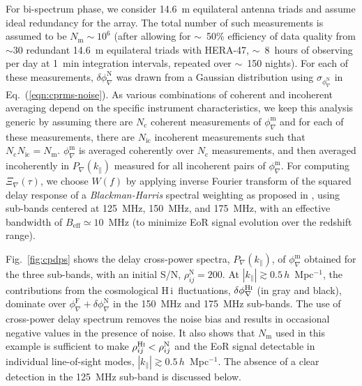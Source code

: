 \documentclass[
reprint,
superscriptaddress,
amsmath,
amssymb,
aps,
prd
]{revtex4-1}
\newcommand{\HI}{H\,{\sc i}}
\begin{document}
For bi-spectrum phase, we consider 14.6~m equilateral antenna triads and assume ideal redundancy for the array. The total number of such measurements is assumed to be $N_\textrm{m} \sim 10^6$ (after allowing for $\sim$~50\% efficiency of data quality from $\sim 30$ redundant 14.6~m equilateral triads with HERA-47, $\sim$~8~hours of observing per day at 1~min integration intervals, repeated over $\sim$~150 nights). For each of these measurements, $\delta\phi_\nabla^\textrm{N}$ was drawn from a Gaussian distribution using $\sigma_{\phi_\nabla^\textrm{N}}$ in Eq.~(\ref{eqn:cprms-noise}). As various combinations of coherent and incoherent averaging depend on the specific instrument characteristics, we keep this analysis generic by assuming there are $N_\textrm{c}$ coherent measurements of $\phi_\nabla^\textrm{m}$ and for each of these measurements, there are $N_\textrm{ic}$ incoherent measurements such that $N_\textrm{c}N_\textrm{ic}=N_\textrm{m}$. $\phi_\nabla^\textrm{m}$ is averaged coherently over $N_\textrm{c}$ measurements, and then averaged incoherently in $P_\nabla(k_\parallel)$ measured for all incoherent pairs of $\phi_\nabla^\textrm{m}$. For computing $\Xi_\nabla(\tau)$, we choose $W(f)$ by applying inverse Fourier transform of the squared delay response of a {\it Blackman-Harris} spectral weighting \cite{har78} as proposed in \cite{thy16}, using sub-bands centered at 125~MHz, 150~MHz, and 175~MHz, with an effective bandwidth of $B_\textrm{eff}\simeq 10$~MHz (to minimize EoR signal evolution over the redshift range).

Fig.~\ref{fig:cpdps} shows the delay cross-power spectra, $P_\nabla(k_\parallel)$, of $\phi_\nabla^\textrm{m}$ obtained for the three sub-bands, with an initial S/N, $\rho_{ij}^\textrm{N}=200$. 
At $|k_\parallel| \gtrsim 0.5\,h$~Mpc$^{-1}$, the contributions from the cosmological \HI\ fluctuations, $\delta\phi_\nabla^\textrm{H{\sc i}}$ (in gray and black), dominate over $\phi_\nabla^\textrm{F} + \delta\phi_\nabla^\textrm{N}$ in the 150~MHz and 175~MHz sub-bands. The use of cross-power delay spectrum removes the noise bias and results in occasional negative values in the presence of noise. It also shows that $N_\textrm{m}$ used in this example is sufficient to make $\rho_{ij}^\textrm{H{\sc i}} < \rho_{ij}^\textrm{N}$ and the EoR signal detectable in individual line-of-sight modes, $|k_\parallel| \gtrsim 0.5\,h$~Mpc$^{-1}$. The absence of a clear detection in the 125~MHz sub-band is discussed below.
\end{document}
